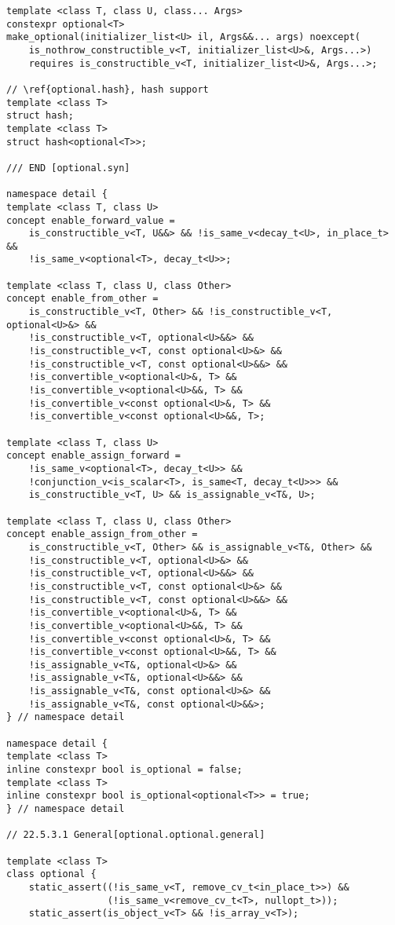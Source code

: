 \documentclass[a4paper,10pt,oneside,openany,final,article]{memoir}
\begin{document}
\begin{verbatim}
template <class T, class U, class... Args>
constexpr optional<T>
make_optional(initializer_list<U> il, Args&&... args) noexcept(
    is_nothrow_constructible_v<T, initializer_list<U>&, Args...>)
    requires is_constructible_v<T, initializer_list<U>&, Args...>;

// \ref{optional.hash}, hash support
template <class T>
struct hash;
template <class T>
struct hash<optional<T>>;

/// END [optional.syn]

namespace detail {
template <class T, class U>
concept enable_forward_value =
    is_constructible_v<T, U&&> && !is_same_v<decay_t<U>, in_place_t> &&
    !is_same_v<optional<T>, decay_t<U>>;

template <class T, class U, class Other>
concept enable_from_other =
    is_constructible_v<T, Other> && !is_constructible_v<T, optional<U>&> &&
    !is_constructible_v<T, optional<U>&&> &&
    !is_constructible_v<T, const optional<U>&> &&
    !is_constructible_v<T, const optional<U>&&> &&
    !is_convertible_v<optional<U>&, T> &&
    !is_convertible_v<optional<U>&&, T> &&
    !is_convertible_v<const optional<U>&, T> &&
    !is_convertible_v<const optional<U>&&, T>;

template <class T, class U>
concept enable_assign_forward =
    !is_same_v<optional<T>, decay_t<U>> &&
    !conjunction_v<is_scalar<T>, is_same<T, decay_t<U>>> &&
    is_constructible_v<T, U> && is_assignable_v<T&, U>;

template <class T, class U, class Other>
concept enable_assign_from_other =
    is_constructible_v<T, Other> && is_assignable_v<T&, Other> &&
    !is_constructible_v<T, optional<U>&> &&
    !is_constructible_v<T, optional<U>&&> &&
    !is_constructible_v<T, const optional<U>&> &&
    !is_constructible_v<T, const optional<U>&&> &&
    !is_convertible_v<optional<U>&, T> &&
    !is_convertible_v<optional<U>&&, T> &&
    !is_convertible_v<const optional<U>&, T> &&
    !is_convertible_v<const optional<U>&&, T> &&
    !is_assignable_v<T&, optional<U>&> &&
    !is_assignable_v<T&, optional<U>&&> &&
    !is_assignable_v<T&, const optional<U>&> &&
    !is_assignable_v<T&, const optional<U>&&>;
} // namespace detail

namespace detail {
template <class T>
inline constexpr bool is_optional = false;
template <class T>
inline constexpr bool is_optional<optional<T>> = true;
} // namespace detail

// 22.5.3.1 General[optional.optional.general]

template <class T>
class optional {
    static_assert((!is_same_v<T, remove_cv_t<in_place_t>>) &&
                  (!is_same_v<remove_cv_t<T>, nullopt_t>));
    static_assert(is_object_v<T> && !is_array_v<T>);


\end{verbatim}
\end{document}
